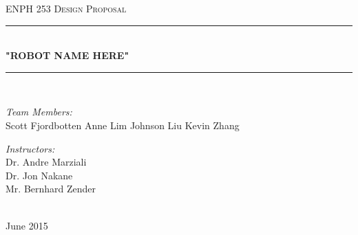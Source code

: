 \documentclass[11pt, oneside]{article} %
\begin{document}


\newcommand{\HRule}{\rule{\linewidth}{0.5mm}} %



\begin{titlepage}
\begin{center}

\textsc{\LARGE ENPH 253 Design Proposal}\\[1.5cm]

\HRule \\[0.4cm] %
{\huge \bfseries "ROBOT NAME HERE"}\\[0.4cm] %
\HRule \\[1.5cm] %
 
\begin{minipage}[t]{0.4\textwidth}
\begin{flushleft} \large
\emph{Team Members:}\\
{Scott Fjordbotten \newline Anne Lim \newline Johnson Liu \newline Kevin Zhang} %
\end{flushleft}
\end{minipage}
\begin{minipage}[t]{0.4\textwidth}
\begin{flushright} \large
\emph{Instructors:} \\
{Dr. Andre Marziali \\ Dr. Jon Nakane \\ Mr. Bernhard Zender} %
\end{flushright}
\end{minipage}\\[3cm]
 
 
{\large June 2015}\\[4cm]
 
\vfill
\end{center}

\end{titlepage}
\end{document}
